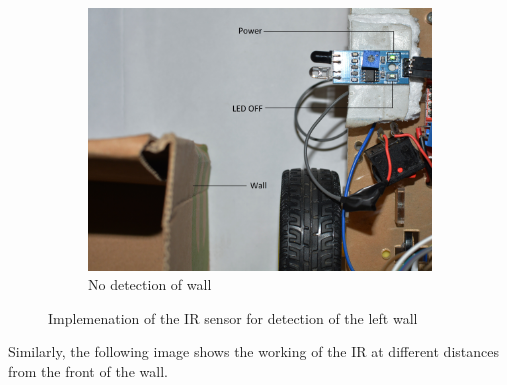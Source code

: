 \begin{figure}[h]
\begin{center}
\begin{subfigure}[b]{0.5\textwidth}
        \end{subfigure}
        \begin{subfigure}[b]{0.5\textwidth}
                  \includegraphics[scale=0.21]{part3_2_lb.jpg} 
                \caption{No detection of wall}
                \label{fig:gull2}
        \end{subfigure}%
        \caption{Implemenation of the IR sensor for detection of the left wall}
\end{center} 
\end{figure}
\justify Similarly, the following image shows the working of the IR at different distances from the front of the wall.\\
\newpage
